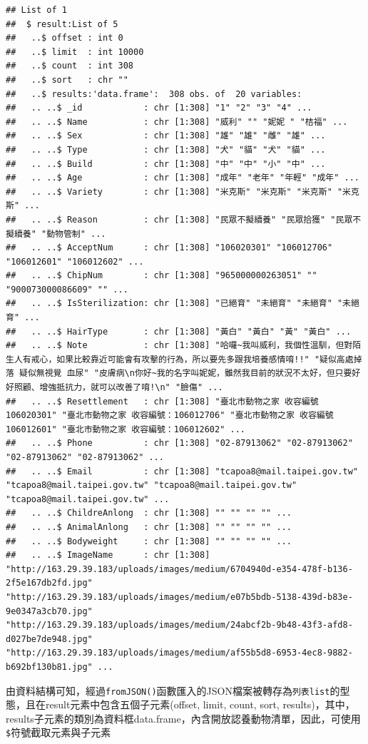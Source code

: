 \documentclass[]{book}
\theoremstyle{definition}
\theoremstyle{definition}
\theoremstyle{remark}
\begin{document}
\begin{verbatim}
## List of 1
##  $ result:List of 5
##   ..$ offset : int 0
##   ..$ limit  : int 10000
##   ..$ count  : int 308
##   ..$ sort   : chr ""
##   ..$ results:'data.frame':  308 obs. of  20 variables:
##   .. ..$ _id            : chr [1:308] "1" "2" "3" "4" ...
##   .. ..$ Name           : chr [1:308] "威利" "" "妮妮 " "桔福" ...
##   .. ..$ Sex            : chr [1:308] "雄" "雄" "雌" "雄" ...
##   .. ..$ Type           : chr [1:308] "犬" "貓" "犬" "貓" ...
##   .. ..$ Build          : chr [1:308] "中" "中" "小" "中" ...
##   .. ..$ Age            : chr [1:308] "成年" "老年" "年輕" "成年" ...
##   .. ..$ Variety        : chr [1:308] "米克斯" "米克斯" "米克斯" "米克斯" ...
##   .. ..$ Reason         : chr [1:308] "民眾不擬續養" "民眾拾獲" "民眾不擬續養" "動物管制" ...
##   .. ..$ AcceptNum      : chr [1:308] "106020301" "106012706" "106012601" "106012602" ...
##   .. ..$ ChipNum        : chr [1:308] "965000000263051" "" "900073000086609" "" ...
##   .. ..$ IsSterilization: chr [1:308] "已絕育" "未絕育" "未絕育" "未絕育" ...
##   .. ..$ HairType       : chr [1:308] "黃白" "黃白" "黃" "黃白" ...
##   .. ..$ Note           : chr [1:308] "哈囉~我叫威利，我個性溫馴，但對陌生人有戒心，如果比較靠近可能會有攻擊的行為，所以要先多跟我培養感情唷!!" "疑似高處掉落 疑似無視覺 血尿" "皮膚病\n你好~我的名字叫妮妮，雖然我目前的狀況不太好，但只要好好照顧、增強抵抗力，就可以改善了唷!\n" "臉傷" ...
##   .. ..$ Resettlement   : chr [1:308] "臺北市動物之家 收容編號106020301" "臺北市動物之家 收容編號：106012706" "臺北市動物之家 收容編號106012601" "臺北市動物之家 收容編號：106012602" ...
##   .. ..$ Phone          : chr [1:308] "02-87913062" "02-87913062" "02-87913062" "02-87913062" ...
##   .. ..$ Email          : chr [1:308] "tcapoa8@mail.taipei.gov.tw" "tcapoa8@mail.taipei.gov.tw" "tcapoa8@mail.taipei.gov.tw" "tcapoa8@mail.taipei.gov.tw" ...
##   .. ..$ ChildreAnlong  : chr [1:308] "" "" "" "" ...
##   .. ..$ AnimalAnlong   : chr [1:308] "" "" "" "" ...
##   .. ..$ Bodyweight     : chr [1:308] "" "" "" "" ...
##   .. ..$ ImageName      : chr [1:308] "http://163.29.39.183/uploads/images/medium/6704940d-e354-478f-b136-2f5e167db2fd.jpg" "http://163.29.39.183/uploads/images/medium/e07b5bdb-5138-439d-b83e-9e0347a3cb70.jpg" "http://163.29.39.183/uploads/images/medium/24abcf2b-9b48-43f3-afd8-d027be7de948.jpg" "http://163.29.39.183/uploads/images/medium/af55b5d8-6953-4ec8-9882-b692bf130b81.jpg" ...
\end{verbatim}

由資料結構可知，經過\texttt{fromJSON()}函數匯入的JSON檔案被轉存為\texttt{列表list}的型態，且在result元素中包含五個子元素(offset,
limit, count, sort,
results)，其中，results子元素的類別為資料框data.frame，內含開放認養動物清單，因此，可使用\texttt{\$}符號截取元素與子元素
\end{document}
